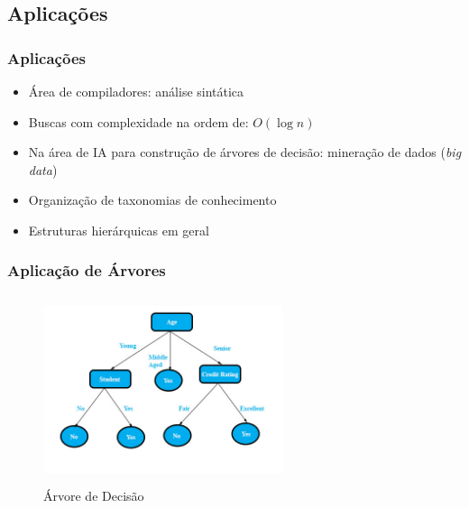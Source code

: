 
\subsection{Aplicações}

\begin{frame}

    \frametitle{Aplicações}

    \begin{itemize}
      \item  Área de compiladores: análise sintática 
      \item  Buscas com complexidade na ordem de: $O(\log n)$ 
      \item  Na área de IA para construção de árvores de decisão: mineração de dados (\textit{big data})
      \item  Organização de taxonomias de conhecimento
      \item  Estruturas hierárquicas em geral      
      
    \end{itemize}    
    
\end{frame}



\begin{frame}

\frametitle{Aplicação  de Árvores}

  \begin{figure}[!ht]
     \centering
    \includegraphics[width=7cm, height=5.5cm]{figs/fig_arvores/aplicacao_decision_tree.jpg}
    \caption{Árvore de Decisão}
    \end{figure}

\end{frame}

